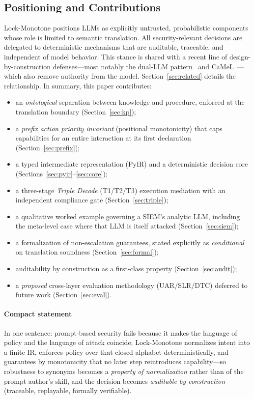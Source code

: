 \documentclass[conference]{IEEEtran}
\begin{document}
\subsection{Positioning and Contributions}
Lock-Monotone positions LLMs as explicitly untrusted, probabilistic
components whose role is limited to semantic translation. All
security-relevant decisions are delegated to deterministic mechanisms that
are auditable, traceable, and independent of model behavior. This stance
is shared with a recent line of design-by-construction
defenses---most notably the dual-LLM pattern~\cite{willison2023dual} and
CaMeL~\cite{debenedetti2025camel}---which also remove authority from the
model. Section~\ref{sec:related} details the relationship. In summary,
this paper contributes:
\begin{itemize}
\item an \emph{ontological} separation between knowledge and procedure,
enforced at the translation boundary (Section~\ref{sec:kp});
\item a \emph{prefix action priority invariant} (positional monotonicity)
that caps capabilities for an entire interaction at its first declaration
(Section~\ref{sec:prefix});
\item a typed intermediate representation (PyIR) and a deterministic
decision core (Sections~\ref{sec:pyir}--\ref{sec:core});
\item a three-stage \emph{Triple Decode} (T1/T2/T3) execution mediation
with an independent compliance gate (Section~\ref{sec:triple});
\item a qualitative worked example governing a SIEM's analytic LLM,
including the meta-level case where that LLM is itself attacked
(Section~\ref{sec:siem});
\item a formalization of non-escalation guarantees, stated explicitly as
\emph{conditional} on translation soundness (Section~\ref{sec:formal});
\item auditability by construction as a first-class property
(Section~\ref{sec:audit});
\item a \emph{proposed} cross-layer evaluation methodology (UAR/SLR/DTC)
deferred to future work (Section~\ref{sec:eval}).
\end{itemize}

\paragraph{Compact statement} In one sentence: prompt-based security fails
because it makes the language of policy and the language of attack coincide;
Lock-Monotone normalizes intent into a finite IR, enforces policy over that
closed alphabet deterministically, and guarantees by monotonicity that no
later step reintroduces capability---so robustness to synonyms becomes a
\emph{property of normalization} rather than of the prompt author's skill,
and the decision becomes \emph{auditable by construction} (traceable,
replayable, formally verifiable).
\end{document}
